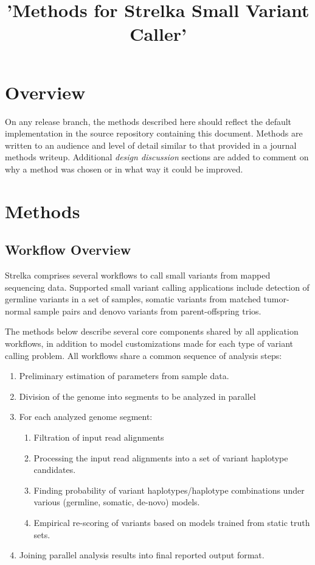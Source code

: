 \documentclass{article}
\title{'Methods for Strelka Small Variant Caller'}
\begin{document}
\maketitle

\tableofcontents

\section{Overview}

On any release branch, the methods described here should reflect the default implementation in the source repository containing this document. Methods are written to an audience and level of detail similar to that provided in a journal methods writeup. Additional \emph{design discussion} sections are added to comment on why a method was chosen or in what way it could be improved.

\section{Methods}

\subsection{Workflow Overview}

Strelka comprises several workflows to call small variants from mapped sequencing data. Supported small variant calling applications include detection of germline variants in a set of samples, somatic variants from matched tumor-normal sample pairs and denovo variants from parent-offspring trios.

The methods below describe several core components shared by all application workflows, in addition to model customizations made for each type of variant calling problem. All workflows share a common sequence of analysis steps:

\begin{enumerate}
\item Preliminary estimation of parameters from sample data.
\item Division of the genome into segments to be analyzed in parallel
\item For each analyzed genome segment:
\begin{enumerate}
\item Filtration of input read alignments
\item Processing the input read alignments into a set of variant haplotype candidates.
\item Finding probability of variant haplotypes/haplotype combinations under various (germline, somatic, de-novo) models.
\item Empirical re-scoring of variants based on models trained from static truth sets.
\end{enumerate}
\item Joining parallel analysis results into final reported output format.
\end{enumerate}
\end{document}
